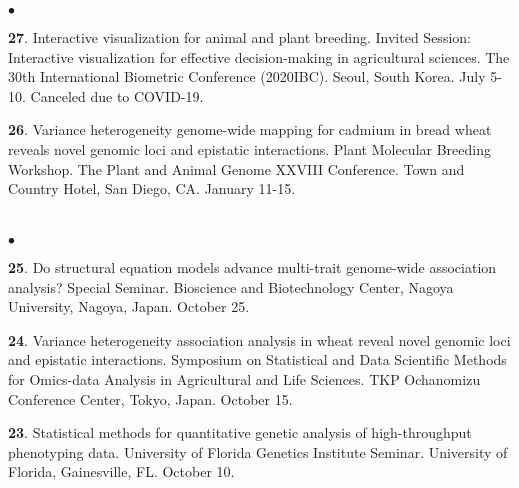 \documentclass[margin,line,10pt]{res}
\newenvironment{list2}{
  \begin{list}{$\bullet$}{%
      \setlength{\itemsep}{0in}
      \setlength{\parsep}{0in} \setlength{\parskip}{0in}
      \setlength{\topsep}{0in} \setlength{\partopsep}{0in} 
      \setlength{\leftmargin}{0.2in}}}{\end{list}}
\begin{document}
\begin{resume}
\begin{list2}
  \vspace{0.5cm}


\item [{\bf 27}.] Interactive visualization for animal and plant breeding. Invited Session: Interactive visualization for effective decision-making in agricultural sciences. The 30th International Biometric Conference (2020IBC). Seoul, South Korea. July 5-10. Canceled due to COVID-19. 

  \vspace{0.5cm}
    
\item [{\bf 26}.] Variance heterogeneity genome-wide mapping for cadmium in bread wheat reveals novel genomic loci and epistatic interactions. Plant Molecular Breeding Workshop. The Plant and Animal Genome XXVIII Conference. Town and Country Hotel, San Diego, CA. January 11-15.
  
\end{list2}



\section{}
\begin{list2}

\item [{\bf 25}.] Do structural equation models advance multi-trait genome-wide association analysis? Special Seminar. Bioscience and Biotechnology Center, Nagoya University, Nagoya, Japan. October 25. 
  
  \vspace{0.5cm}
  
   \item [{\bf 24}.] Variance heterogeneity association analysis in wheat reveal novel genomic loci and epistatic interactions. Symposium on Statistical and Data Scientific Methods for Omics-data Analysis in Agricultural and Life Sciences. TKP Ochanomizu Conference Center, Tokyo, Japan. October 15.

     \vspace{0.5cm}
    
  \item [{\bf 23}.] Statistical methods for quantitative genetic analysis of high-throughput phenotyping data.  University of Florida Genetics Institute Seminar. University of Florida, Gainesville, FL. October 10.

    \vspace{0.5cm}
    

\end{list2}
\end{resume}
\end{document}
